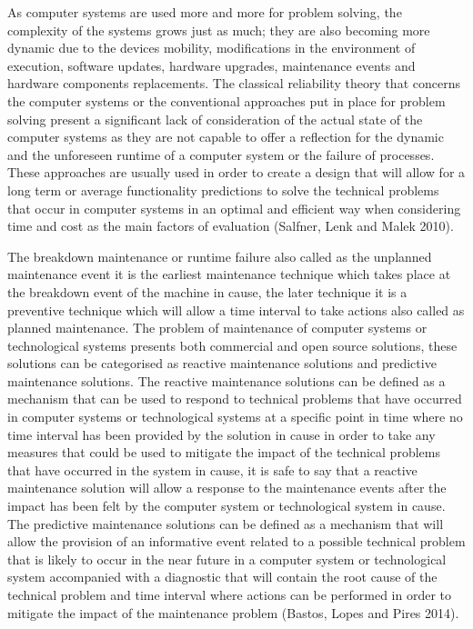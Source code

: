 As computer systems are used more and more for problem solving, the complexity of the systems grows just as much;
they are also becoming more dynamic due to the devices mobility, modifications in the environment of execution,
software updates, hardware upgrades, maintenance events and hardware components replacements.
The classical reliability theory that concerns the computer systems or the conventional approaches put in place for
problem solving present a significant lack of consideration of the actual state of the computer systems as they are
not capable to offer a reflection for the dynamic and the unforeseen runtime of a computer system or the failure of
processes. These approaches are usually used in order to create a design that will allow for a long term or average
functionality predictions to solve the technical problems that occur in computer systems in an optimal and efficient
way when considering time and cost as the main factors of evaluation (Salfner, Lenk and Malek 2010). \par
The breakdown maintenance or runtime failure also called as the unplanned maintenance event it is the earliest
maintenance technique which takes place at the breakdown event of the machine in cause, the later technique
it is a preventive technique which will allow a time interval to take actions also called as planned
maintenance. The problem of maintenance of computer systems or technological systems presents both commercial
and open source solutions, these solutions can be categorised as reactive maintenance solutions and predictive
maintenance solutions. The reactive maintenance solutions can be defined as a mechanism that can be used to
respond to technical problems that have occurred in computer systems or technological systems at a specific
point in time where no time interval has been provided by the solution in cause in order to take any measures
that could be used to mitigate the impact of the technical problems that have occurred in the system in cause,
it is safe to say that a reactive maintenance solution will allow a response to the maintenance events after
the impact has been felt by the computer system or technological system in cause. The predictive maintenance
solutions can be defined as a mechanism that will allow the provision of an informative event related to a
possible technical problem that is likely to occur in the near future in a computer system or technological
system accompanied with a diagnostic that will contain the root cause of the technical problem and time
interval where actions can be performed in order to mitigate the impact of the maintenance problem
(Bastos, Lopes and Pires 2014).


